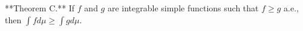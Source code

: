 **Theorem C.** If $f$ and $g$ are integrable simple functions such that $f \geq g$ a.e., then $\int f d\mu \geq \int g d\mu$.

